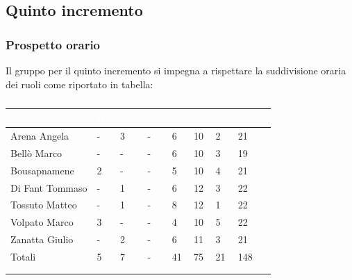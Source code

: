     \subsection{Quinto incremento} 
    {
    \subsubsection{Prospetto orario}
    {
    Il gruppo per il quinto incremento si impegna a rispettare la suddivisione oraria dei ruoli come riportato in tabella:
      \setlength{\freewidth}{\dimexpr\textwidth-30\tabcolsep}
      \renewcommand{\arraystretch}{1.0}
      \setlength{\aboverulesep}{0pt}
      \setlength{\belowrulesep}{0pt}
      \begin{longtable}{C{.4\freewidth} C{.1\freewidth} C{.1\freewidth} C{.1\freewidth} C{.1\freewidth} C{.1\freewidth} C{.1\freewidth} C{.1\freewidth} C{.1\freewidth}}
      \toprule
      \textcolor{white}{\textbf{Componente}}&
      \textcolor{white}{\textbf{Re}}&
      \textcolor{white}{\textbf{Am}}&
      \textcolor{white}{\textbf{An}}&
      \textcolor{white}{\textbf{Pt}}&
      \textcolor{white}{\textbf{Pr}}&
      \textcolor{white}{\textbf{Ve}}&
      \textcolor{white}{\textbf{Ore}}\\
      \toprule
      \endhead

      Arena Angela & - & 3 & -  & 6 & 10 & 2 & 21 \\      
      Bellò Marco & - & - & - & 6 & 10 & 3 & 19 \\      
      Bousapnamene & 2 & - & - & 5 & 10 & 4 & 21 \\      
      Di Fant Tommaso & - & 1 & - & 6 & 12 & 3 & 22 \\      
      Tossuto Matteo & - & 1 & - & 8 & 12 & 1 & 22 \\      
      Volpato Marco & 3 & - & - & 4 & 10 & 5 & 22 \\      
      Zanatta Giulio & - & 2 & - & 6 & 11 & 3 & 21 \\      
      Totali & 5 & 7 & - & 41 & 75 & 21 & 148 \\
      \bottomrule
      \\
      \caption{}
      \end{longtable} 

}}
